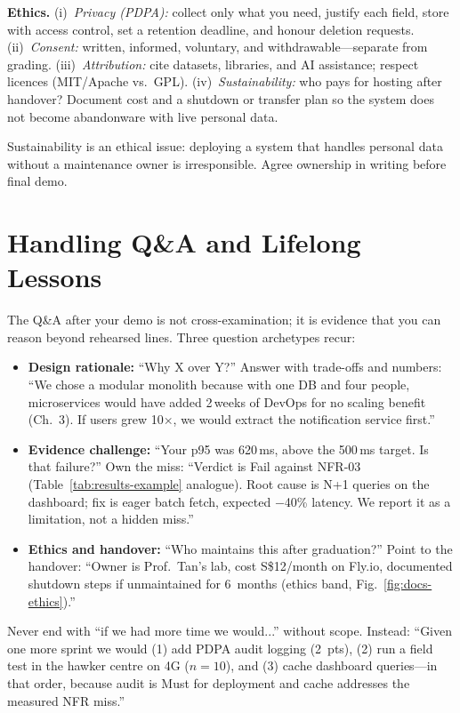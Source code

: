 \textbf{Ethics.} (i)~\emph{Privacy (PDPA):} collect only what you need, justify each field, store with access control, set a retention deadline, and honour deletion requests. (ii)~\emph{Consent:} written, informed, voluntary, and withdrawable---separate from grading. (iii)~\emph{Attribution:} cite datasets, libraries, and AI assistance; respect licences (MIT/Apache vs.\ GPL). (iv)~\emph{Sustainability:} who pays for hosting after handover? Document cost and a shutdown or transfer plan so the system does not become abandonware with live personal data.

Sustainability is an ethical issue: deploying a system that handles personal data without a maintenance owner is irresponsible. Agree ownership in writing before final demo.

\section{Handling Q\&A and Lifelong Lessons}
\label{sec:qanda}

The Q\&A after your demo is not cross-examination; it is evidence that you can reason beyond rehearsed lines. Three question archetypes recur:

\begin{itemize}
    \item \textbf{Design rationale:} ``Why X over Y?'' Answer with trade-offs and numbers: ``We chose a modular monolith because with one DB and four people, microservices would have added 2\,weeks of DevOps for no scaling benefit (Ch.~3). If users grew 10$\times$, we would extract the notification service first.''
    \item \textbf{Evidence challenge:} ``Your p95 was 620\,ms, above the 500\,ms target. Is that failure?'' Own the miss: ``Verdict is Fail against NFR-03 (Table~\ref{tab:results-example} analogue). Root cause is N+1 queries on the dashboard; fix is eager batch fetch, expected $-$40\% latency. We report it as a limitation, not a hidden miss.''
    \item \textbf{Ethics and handover:} ``Who maintains this after graduation?'' Point to the handover: ``Owner is Prof.~Tan's lab, cost S\$12/month on Fly.io, documented shutdown steps if unmaintained for 6~months (ethics band, Fig.~\ref{fig:docs-ethics}).''
\end{itemize}

\begin{remark}
Never end with ``if we had more time we would...'' without scope. Instead: ``Given one more sprint we would (1) add PDPA audit logging (2~pts), (2) run a field test in the hawker centre on 4G ($n=10$), and (3) cache dashboard queries---in that order, because audit is Must for deployment and cache addresses the measured NFR miss.''
\end{remark}

